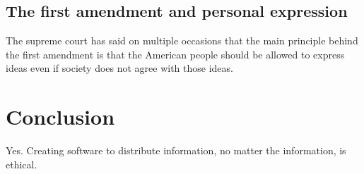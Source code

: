 \documentclass[11pt]{article}
\begin{document}
\subsection{The first amendment and personal expression}

The supreme court has said on multiple occasions that the main principle behind the first amendment is that the American people should be allowed to express ideas even if society does not agree with those ideas. 

\section{Conclusion}
Yes. Creating software to distribute information, no matter the information, is ethical.

\newpage


\end{document}
